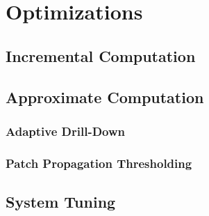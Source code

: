 \section{Optimizations}

\subsection{Incremental Computation}\label{sec:inc_computation}

\subsection{Approximate Computation}

\subsubsection{Adaptive Drill-Down}

\subsubsection{Patch Propagation Thresholding}

\subsection{System Tuning}
